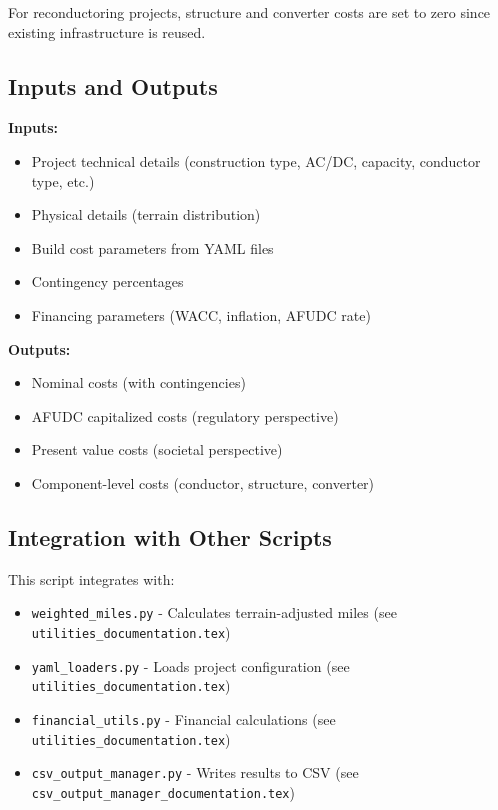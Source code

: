 \documentclass[12pt]{article}
\begin{document}
For reconductoring projects, structure and converter costs are set to zero since existing infrastructure is reused.

\subsection{Inputs and Outputs}

\textbf{Inputs:}
\begin{itemize}
    \item Project technical details (construction type, AC/DC, capacity, conductor type, etc.)
    \item Physical details (terrain distribution)
    \item Build cost parameters from YAML files
    \item Contingency percentages
    \item Financing parameters (WACC, inflation, AFUDC rate)
\end{itemize}

\textbf{Outputs:}
\begin{itemize}
    \item Nominal costs (with contingencies)
    \item AFUDC capitalized costs (regulatory perspective)
    \item Present value costs (societal perspective)
    \item Component-level costs (conductor, structure, converter)
\end{itemize}

\subsection{Integration with Other Scripts}

This script integrates with:
\begin{itemize}
    \item \texttt{weighted\_miles.py} - Calculates terrain-adjusted miles (see \texttt{utilities\_documentation.tex})
    \item \texttt{yaml\_loaders.py} - Loads project configuration (see \texttt{utilities\_documentation.tex})
    \item \texttt{financial\_utils.py} - Financial calculations (see \texttt{utilities\_documentation.tex})
    \item \texttt{csv\_output\_manager.py} - Writes results to CSV (see \texttt{csv\_output\_manager\_documentation.tex})
\end{itemize}
\end{document}
